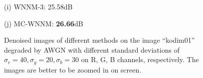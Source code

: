 \documentclass[10pt,onecolumn,letterpaper]{article}
\begin{document}
\begin{figure}[!htbp]
{\begin{minipage}[t]{0.25\textwidth}
{\footnotesize (i) WNNM-3: 25.58dB }
\end{minipage}
\begin{minipage}[t]{0.25\textwidth}
\centering
{}
{\footnotesize (j) MC-WNNM: \textbf{26.66}dB}
\end{minipage}
}
\caption{Denoised images of different methods on the image ``kodim01'' degraded by AWGN with different standard deviations of $\sigma_{r}=40, \sigma_{g}=20, \sigma_{b}=30$ on R, G, B channels, respectively. The images are better to be zoomed in on screen.}
\label{f1}
\end{figure}
\end{document}
